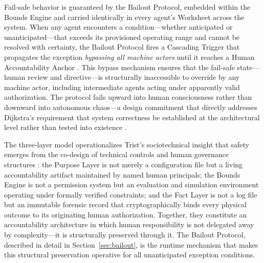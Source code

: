 Fail-safe behavior is guaranteed by the Bailout Protocol, embedded within the Bounds Engine and carried identically in every agent's Worksheet across the system. When any agent encounters a condition—whether anticipated or unanticipated—that exceeds its provisioned operating range and cannot be resolved with certainty, the Bailout Protocol fires a Cascading Trigger that propagates the exception \emph{bypassing all machine actors} until it reaches a Human Accountability Anchor \cite{tristr81}. This bypass mechanism ensures that the fail-safe state—human review and directive—is structurally inaccessible to override by any machine actor, including intermediate agents acting under apparently valid authorization. The protocol fails upward into human consciousness rather than downward into autonomous chaos—a design commitment that directly addresses Dijkstra's requirement that system correctness be established at the architectural level rather than tested into existence \cite{dijkstra1982}.

The three-layer model operationalizes Trist's sociotechnical insight that safety emerges from the co-design of technical controls and human governance structures \cite{tristr81}: the Purpose Layer is not merely a configuration file but a living accountability artifact maintained by named human principals; the Bounds Engine is not a permission system but an evaluation and simulation environment operating under formally verified constraints; and the Fact Layer is not a log file but an immutable forensic record that cryptographically binds every physical outcome to its originating human authorization. Together, they constitute an accountability architecture in which human responsibility is not delegated away by complexity—it is structurally preserved through it. The Bailout Protocol, described in detail in Section~\ref{sec:bailout}, is the runtime mechanism that makes this structural preservation operative for all unanticipated exception conditions.